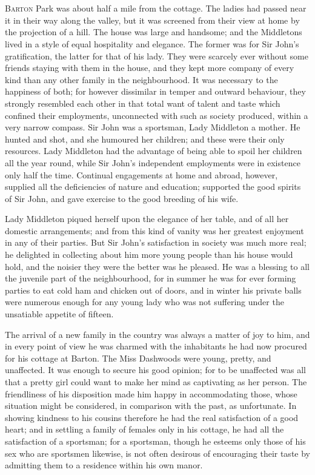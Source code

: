 \chapter[Chapter \thechapter]{}
\lettrine[lines=4,lraise=0.3]{B}{arton} Park was about half a mile from the cottage. The ladies had passed near it in their way along the valley, but it was screened from their view at home by the projection of a hill. The house was large and handsome; and the Middletons lived in a style of equal hospitality and elegance. The former was for Sir John’s gratification, the latter for that of his lady. They were scarcely ever without some friends staying with them in the house, and they kept more company of every kind than any other family in the neighbourhood. It was necessary to the happiness of both; for however dissimilar in temper and outward behaviour, they strongly resembled each other in that total want of talent and taste which confined their employments, unconnected with such as society produced, within a very narrow compass. Sir John was a sportsman, Lady Middleton a mother. He hunted and shot, and she humoured her children; and these were their only resources. Lady Middleton had the advantage of being able to spoil her children all the year round, while Sir John’s independent employments were in existence only half the time. Continual engagements at home and abroad, however, supplied all the deficiencies of nature and education; supported the good spirits of Sir John, and gave exercise to the good breeding of his wife.

Lady Middleton piqued herself upon the elegance of her table, and of all her domestic arrangements; and from this kind of vanity was her greatest enjoyment in any of their parties. But Sir John’s satisfaction in society was much more real; he delighted in collecting about him more young people than his house would hold, and the noisier they were the better was he pleased. He was a blessing to all the juvenile part of the neighbourhood, for in summer he was for ever forming parties to eat cold ham and chicken out of doors, and in winter his private balls were numerous enough for any young lady who was not suffering under the unsatiable appetite of fifteen.

The arrival of a new family in the country was always a matter of joy to him, and in every point of view he was charmed with the inhabitants he had now procured for his cottage at Barton. The Miss Dashwoods were young, pretty, and unaffected. It was enough to secure his good opinion; for to be unaffected was all that a pretty girl could want to make her mind as captivating as her person. The friendliness of his disposition made him happy in accommodating those, whose situation might be considered, in comparison with the past, as unfortunate. In showing kindness to his cousins therefore he had the real satisfaction of a good heart; and in settling a family of females only in his cottage, he had all the satisfaction of a sportsman; for a sportsman, though he esteems only those of his sex who are sportsmen likewise, is not often desirous of encouraging their taste by admitting them to a residence within his own manor.

